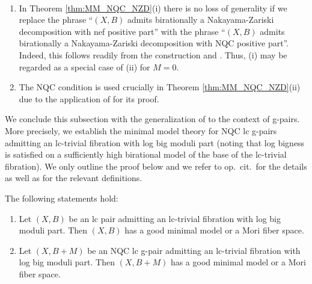 	\begin{rem}~
		\label{rem:comment_BH14b_1.1-g}
		\begin{enumerate}[(1)]
			\item In Theorem \ref{thm:MM_NQC_NZD}(i) there is no loss of generality if we replace the phrase \enquote{$ (X,B) $ admits birationally a Nakayama-Zariski decomposition with nef positive part} with the phrase \enquote{$ (X,B) $ admits birationally a Nakayama-Zariski decomposition with NQC positive part}. Indeed, this follows readily from the construction and \cite[2.1.8 and Theorem 4.7.2(3)]{Fuj17}. Thus, (i) may be regarded as a special case of (ii) for $ M = 0 $.
			
			\item The NQC condition is used crucially in Theorem \ref{thm:MM_NQC_NZD}(ii) due to the application of \cite[Lemma 3.22]{HanLi22} for its proof.
		\end{enumerate}
	\end{rem}
	
	We conclude this subsection with the generalization of  \cite[Theorem 4.5]{Hash22c} to the context of g-pairs. More precisely, we establish the minimal model theory for NQC lc g-pairs admitting an lc-trivial fibration with log big moduli part (noting that log bigness is satisfied on a sufficiently high birational model of the base of the lc-trivial fibration). We only outline the proof below and we refer to op.\ cit.\ for the details as well as for the relevant definitions.
	
	\begin{thm}\label{thm:MM_logbigmoduli}
		The following statements hold:
		
		\begin{enumerate}[\normalfont (i)]
			\item Let $ (X,B) $ be an lc pair admitting an lc-trivial fibration with log big moduli part. Then $ (X,B) $ has a good minimal model or a Mori fiber space.
			
			\item Let $(X,B+M)$ be an NQC lc g-pair admitting an lc-trivial fibration with log big moduli part. Then $(X,B+M)$ has a good minimal model or a Mori fiber space.
		\end{enumerate}
	\end{thm}
	
